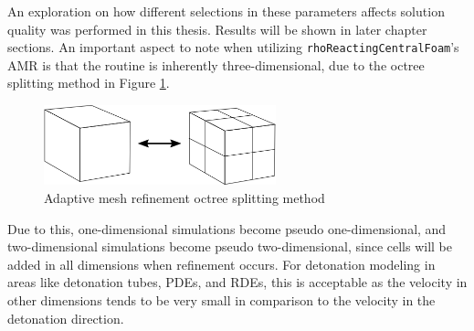 An exploration on how different selections in these parameters affects solution quality was performed in this thesis. Results will be shown in later chapter sections. An important aspect to note when utilizing \verb|rhoReactingCentralFoam|'s AMR is that the routine is inherently three-dimensional, due to the octree splitting method in Figure \ref{fig:octree}. 
\begin{figure}[b]
\centering
\includegraphics[width=0.6\textwidth]{./figs/amr_example.png}
\caption{Adaptive mesh refinement octree splitting method}
\label{fig:octree}
\end{figure}%
\noindent Due to this, one-dimensional simulations become pseudo one-dimensional, and two-dimensional simulations become pseudo two-dimensional, since cells will be added in all dimensions when refinement occurs. For detonation modeling in areas like detonation tubes, PDEs, and RDEs, this is acceptable as the velocity in other dimensions tends to be very small in comparison to the velocity in the detonation direction. 

